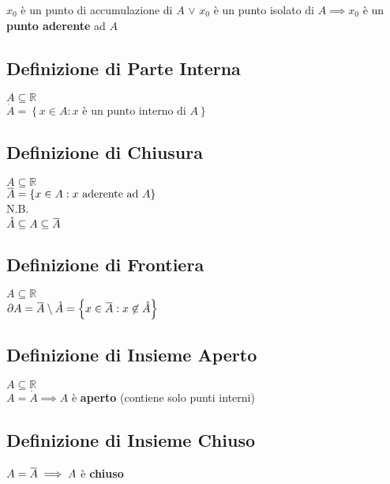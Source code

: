 \documentclass[a4paper, twoside, italian, 11pt]{book}
\newcommand{\braces}[1] {\left \{ #1 \right \}}
\newcommand{\overbar}[1] {\mkern 1.5mu\overline{\mkern-1.5mu#1\mkern-1.5mu}\mkern 1.5mu}
\newcommand{\R}{\mathbb{R}}
\begin{document}
\noindent
$x_0$ è un punto di accumulazione di $A$ $\lor$ $x_0$ è un punto isolato di $A \implies x_0$ è un \textbf{punto aderente} ad $A$


\subsection{Definizione di Parte Interna}

\noindent
$A \subseteq \R$ \\

$\mathring A = \braces{x \in A : x \text{ è un punto interno di } A}$


\subsection{Definizione di Chiusura}

\noindent
$A \subseteq \R$ \\

$\overbar A = \braces{x \in A : x \text{ aderente ad } A}$ \\

\noindent
N.B. \\
$\mathring A \subseteq A \subseteq \overbar A$


\subsection{Definizione di Frontiera}

\noindent
$A \subseteq \R$ \\

$\partial A = \overbar A \setminus \mathring A = \braces{x \in \overbar A : x \not\in \mathring A}$


\subsection{Definizione di Insieme Aperto}

\noindent
$A \subseteq \R$ \\

$A = \mathring{A} \implies A$ è \textbf{aperto} (contiene solo punti interni)


\subsection{Definizione di Insieme Chiuso}

$A = \overbar A \implies A$ è \textbf{chiuso}
\end{document}

